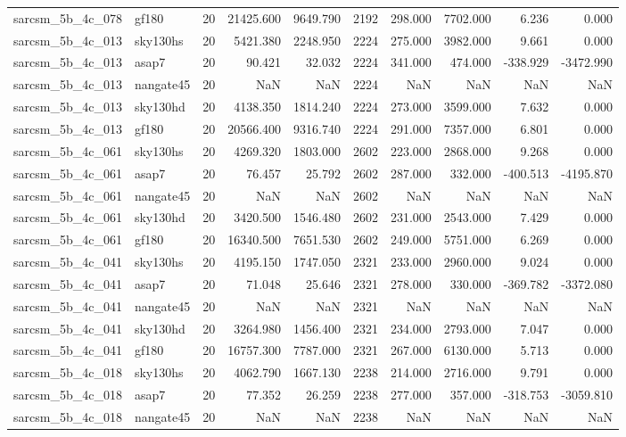 \documentclass{article}
\begin{document}
\begin{longtable}{llrrrrrrrr}
sarcsm\_5b\_4c\_078 & gf180 & 20 & 21425.600 & 9649.790 & 2192 & 298.000 & 7702.000 & 6.236 & 0.000 \\
sarcsm\_5b\_4c\_013 & sky130hs & 20 & 5421.380 & 2248.950 & 2224 & 275.000 & 3982.000 & 9.661 & 0.000 \\
sarcsm\_5b\_4c\_013 & asap7 & 20 & 90.421 & 32.032 & 2224 & 341.000 & 474.000 & -338.929 & -3472.990 \\
sarcsm\_5b\_4c\_013 & nangate45 & 20 & NaN & NaN & 2224 & NaN & NaN & NaN & NaN \\
sarcsm\_5b\_4c\_013 & sky130hd & 20 & 4138.350 & 1814.240 & 2224 & 273.000 & 3599.000 & 7.632 & 0.000 \\
sarcsm\_5b\_4c\_013 & gf180 & 20 & 20566.400 & 9316.740 & 2224 & 291.000 & 7357.000 & 6.801 & 0.000 \\
sarcsm\_5b\_4c\_061 & sky130hs & 20 & 4269.320 & 1803.000 & 2602 & 223.000 & 2868.000 & 9.268 & 0.000 \\
sarcsm\_5b\_4c\_061 & asap7 & 20 & 76.457 & 25.792 & 2602 & 287.000 & 332.000 & -400.513 & -4195.870 \\
sarcsm\_5b\_4c\_061 & nangate45 & 20 & NaN & NaN & 2602 & NaN & NaN & NaN & NaN \\
sarcsm\_5b\_4c\_061 & sky130hd & 20 & 3420.500 & 1546.480 & 2602 & 231.000 & 2543.000 & 7.429 & 0.000 \\
sarcsm\_5b\_4c\_061 & gf180 & 20 & 16340.500 & 7651.530 & 2602 & 249.000 & 5751.000 & 6.269 & 0.000 \\
sarcsm\_5b\_4c\_041 & sky130hs & 20 & 4195.150 & 1747.050 & 2321 & 233.000 & 2960.000 & 9.024 & 0.000 \\
sarcsm\_5b\_4c\_041 & asap7 & 20 & 71.048 & 25.646 & 2321 & 278.000 & 330.000 & -369.782 & -3372.080 \\
sarcsm\_5b\_4c\_041 & nangate45 & 20 & NaN & NaN & 2321 & NaN & NaN & NaN & NaN \\
sarcsm\_5b\_4c\_041 & sky130hd & 20 & 3264.980 & 1456.400 & 2321 & 234.000 & 2793.000 & 7.047 & 0.000 \\
sarcsm\_5b\_4c\_041 & gf180 & 20 & 16757.300 & 7787.000 & 2321 & 267.000 & 6130.000 & 5.713 & 0.000 \\
sarcsm\_5b\_4c\_018 & sky130hs & 20 & 4062.790 & 1667.130 & 2238 & 214.000 & 2716.000 & 9.791 & 0.000 \\
sarcsm\_5b\_4c\_018 & asap7 & 20 & 77.352 & 26.259 & 2238 & 277.000 & 357.000 & -318.753 & -3059.810 \\
sarcsm\_5b\_4c\_018 & nangate45 & 20 & NaN & NaN & 2238 & NaN & NaN & NaN & NaN \\

\end{longtable}
\end{document}
